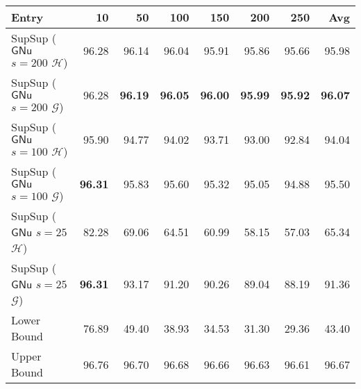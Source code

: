 \begin{tabular}{lrrrrrrr}
\toprule
                                                      Entry &    10 &    50 &   100 &   150 &   200 &   250 &   Avg \\
\midrule
 SupSup ($\ensuremath{\mathsf{GNu}}$ $s=200$ $\mathcal{H}$) & 96.28 & 96.14 & 96.04 & 95.91 & 95.86 & 95.66 & 95.98 \\
 SupSup ($\ensuremath{\mathsf{GNu}}$ $s=200$ $\mathcal{G}$) & 96.28 & \textbf{96.19} & \textbf{96.05} & \textbf{96.00} & \textbf{95.99} & \textbf{95.92} & \textbf{96.07} \\
 SupSup ($\ensuremath{\mathsf{GNu}}$ $s=100$ $\mathcal{H}$) & 95.90 & 94.77 & 94.02 & 93.71 & 93.00 & 92.84 & 94.04 \\
 SupSup ($\ensuremath{\mathsf{GNu}}$ $s=100$ $\mathcal{G}$) & \textbf{96.31} & 95.83 & 95.60 & 95.32 & 95.05 & 94.88 & 95.50 \\
  SupSup ($\ensuremath{\mathsf{GNu}}$ $s=25$ $\mathcal{H}$) & 82.28 & 69.06 & 64.51 & 60.99 & 58.15 & 57.03 & 65.34 \\
  SupSup ($\ensuremath{\mathsf{GNu}}$ $s=25$ $\mathcal{G}$) & \textbf{96.31} & 93.17 & 91.20 & 90.26 & 89.04 & 88.19 & 91.36 \\
                                                Lower Bound & 76.89 & 49.40 & 38.93 & 34.53 & 31.30 & 29.36 & 43.40 \\\midrule
                                                Upper Bound & 96.76 & 96.70 & 96.68 & 96.66 & 96.63 & 96.61 & 96.67 \\
\bottomrule
\end{tabular}
